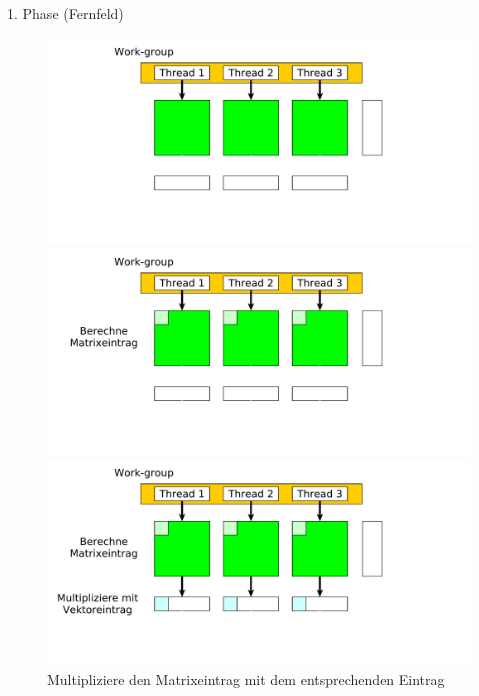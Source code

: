 \documentclass[10pt]{beamer}
\begin{document}
\begin{frame}{1. Phase (Fernfeld)}
  \begin{figure}
    \begin{overprint}
        \centering
        \includegraphics[width=\linewidth]{figures/fg-ff-initial-situation.pdf}
        \caption{Ausgangssituation einer OpenCL work-group in der 1. Phase.}
        \centering
        \includegraphics[width=\linewidth]{figures/fg-ff-compute-matrix-entry.pdf}
        \caption{Berechne den ersten Eintrag einer Matrixzeile.}
        \centering
        \includegraphics[width=\linewidth]{figures/fg-ff-multiply-vector.pdf}
        \caption{Multipliziere den Matrixeintrag mit dem entsprechenden Eintrag
}
\end{overprint}
\end{figure}
\end{frame}
\end{document}
